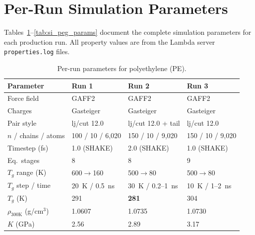 \documentclass[journal=acsami,manuscript=suppinfo]{achemso}
\begin{document}
\section{Per-Run Simulation Parameters}
\label{sec:si_per_run_params}

Tables~\ref{tab:si_pe_params}--\ref{tab:si_peg_params} document the complete simulation parameters for each production run.
All property values are from the Lambda server \texttt{properties.log} files.

\begin{table}[H]
\centering
\caption{Per-run parameters for polyethylene (PE).}
\label{tab:si_pe_params}
\small
\begin{tabular}{llll}
\toprule
\textbf{Parameter} & \textbf{Run 1} & \textbf{Run 2} & \textbf{Run 3} \\
\midrule
Force field & GAFF2 & GAFF2 & GAFF2 \\
Charges & Gasteiger & Gasteiger & Gasteiger \\
Pair style & lj/cut 12.0 & lj/cut 12.0 + tail & lj/cut 12.0 \\
$n$ / chains / atoms & 100 / 10 / 6{,}020 & 150 / 10 / 9{,}020 & 150 / 10 / 9{,}020 \\
Timestep (fs) & 1.0 (SHAKE) & 2.0 (SHAKE) & 1.0 (SHAKE) \\
Eq.\ stages & 8 & 8 & 9 \\
$T_g$ range (K) & 600$\to$160 & 500$\to$80 & 500$\to$80 \\
$T_g$ step / time & 20~K / 0.5~ns & 30~K / 0.2--1~ns & 10~K / 1--2~ns \\
\midrule
$T_g$ (K) & 291 & \textbf{281} & 304 \\
$\rho_{300\text{K}}$ (g/cm$^3$) & 1.0607 & 1.0735 & 1.0730 \\
$K$ (GPa) & 2.56 & 2.89 & 3.17 \\
\bottomrule
\end{tabular}
\end{table}
\end{document}
